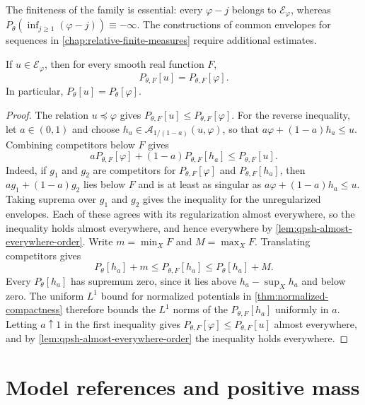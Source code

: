 The finiteness of the family is essential: every $\varphi-j$ belongs to $\mathcal E_\varphi$, whereas $P_\theta(\inf_{j\geq1}(\varphi-j))\equiv-\infty$. The constructions of common envelopes for sequences in \cref{chap:relative-finite-measures} require additional estimates.

\begin{proposition}\label{prop:relative-envelope-equality}
If $u\in\mathcal E_\varphi$, then for every smooth real function $F$,
\[
 P_{\theta,F}[u]=P_{\theta,F}[\varphi].
\]
In particular, $P_\theta[u]=P_\theta[\varphi]$.
\end{proposition}
\begin{proof}
The relation $u\preceq\varphi$ gives $P_{\theta,F}[u]\leq P_{\theta,F}[\varphi]$. For the reverse inequality, let $a\in(0,1)$ and choose $h_a\in\mathcal A_{1/(1-a)}(u,\varphi)$, so that $a\varphi+(1-a)h_a\leq u$. Combining competitors below $F$ gives
\[
 aP_{\theta,F}[\varphi]+(1-a)P_{\theta,F}[h_a]
 \leq P_{\theta,F}[u].
\]
Indeed, if $g_1$ and $g_2$ are competitors for $P_{\theta,F}[\varphi]$ and $P_{\theta,F}[h_a]$, then $ag_1+(1-a)g_2$ lies below $F$ and is at least as singular as $a\varphi+(1-a)h_a\leq u$. Taking suprema over $g_1$ and $g_2$ gives the inequality for the unregularized envelopes. Each of these agrees with its regularization almost everywhere, so the inequality holds almost everywhere, and hence everywhere by \cref{lem:qpsh-almost-everywhere-order}. Write $m=\min_XF$ and $M=\max_XF$. Translating competitors gives
\[
 P_\theta[h_a]+m\leq P_{\theta,F}[h_a]\leq P_\theta[h_a]+M.
\]
Every $P_\theta[h_a]$ has supremum zero, since it lies above $h_a-\sup_Xh_a$ and below zero. The uniform $L^1$ bound for normalized potentials in \cref{thm:normalized-compactness} therefore bounds the $L^1$ norms of the $P_{\theta,F}[h_a]$ uniformly in $a$. Letting $a\uparrow1$ in the first inequality gives $P_{\theta,F}[\varphi]\leq P_{\theta,F}[u]$ almost everywhere, and by \cref{lem:qpsh-almost-everywhere-order} the inequality holds everywhere.
\end{proof}

\section{Model references and positive mass}
\label{sec:relative-envelope-room}

